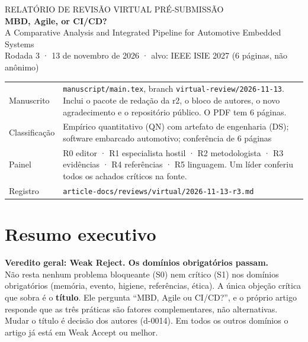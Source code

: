 \documentclass[10pt,a4paper]{article}
\begin{document}
\begin{tcolorbox}[colback=accent,colframe=accent,arc=0pt,left=12pt,right=12pt,top=10pt,bottom=10pt]
\color{white}
{\small RELATÓRIO DE REVISÃO VIRTUAL PRÉ-SUBMISSÃO}\\[3pt]
{\LARGE\bfseries MBD, Agile, or CI/CD?}\\[2pt]
{\normalsize A Comparative Analysis and Integrated Pipeline for Automotive Embedded Systems}\\[6pt]
{\small Rodada 3 · 13 de novembro de 2026 · alvo: IEEE ISIE 2027 (6 páginas, não anônimo)}
\end{tcolorbox}

\vspace{4pt}
\begin{tabularx}{\linewidth}{@{}>{\color{muted}\small}l>{\small}X@{}}
Manuscrito & \texttt{manuscript/main.tex}, branch \texttt{virtual-review/2026-11-13}. Inclui o pacote de redação da r2, o bloco de autores, o novo agradecimento e o repositório público. O PDF tem 6 páginas.\\
Classificação & Empírico quantitativo (QN) com artefato de engenharia (DS); software embarcado automotivo; conferência de 6 páginas\\
Painel & R0 editor · R1 especialista hostil · R2 metodologista · R3 evidências · R4 referências · R5 linguagem. Um líder conferiu todos os achados críticos na fonte.\\
Registro & \texttt{article-docs/reviews/virtual/2026-11-13-r3.md}\\
\end{tabularx}

\section{Resumo executivo}

\begin{tcolorbox}[colback=WR,colframe=WR!60!black,boxrule=0.6pt,arc=2pt,left=10pt,right=10pt]
\textbf{Veredito geral: Weak Reject. Os domínios obrigatórios passam.}\\[2pt]
Não resta nenhum problema bloqueante (S0) nem crítico (S1) nos domínios obrigatórios (memória, evento, higiene, referências, ética). A única objeção crítica que sobra é o \textbf{título}. Ele pergunta ``MBD, Agile ou CI/CD?'', e o próprio artigo responde que as três práticas são fatores complementares, não alternativas. Mudar o título é decisão dos autores (d-0014). Em todos os outros domínios o artigo já está em Weak Accept ou melhor.
\end{tcolorbox}
\end{document}
